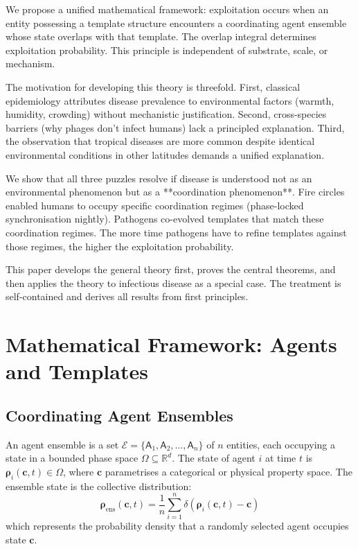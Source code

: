 \documentclass[11pt,twocolumn,a4paper]{article}
\newcommand{\R}{\mathbb{R}}
\newcommand{\Agent}{\mathsf{A}}
\newcommand{\State}{\boldsymbol{\rho}}
\begin{document}
We propose a unified mathematical framework: exploitation occurs when an entity possessing a template structure encounters a coordinating agent ensemble whose state overlaps with that template. The overlap integral determines exploitation probability. This principle is independent of substrate, scale, or mechanism.

The motivation for developing this theory is threefold. First, classical epidemiology attributes disease prevalence to environmental factors (warmth, humidity, crowding) without mechanistic justification. Second, cross-species barriers (why phages don't infect humans) lack a principled explanation. Third, the observation that tropical diseases are more common despite identical environmental conditions in other latitudes demands a unified explanation.

We show that all three puzzles resolve if disease is understood not as an environmental phenomenon but as a **coordination phenomenon**. Fire circles enabled humans to occupy specific coordination regimes (phase-locked synchronisation nightly). Pathogens co-evolved templates that match these coordination regimes. The more time pathogens have to refine templates against those regimes, the higher the exploitation probability.

This paper develops the general theory first, proves the central theorems, and then applies the theory to infectious disease as a special case. The treatment is self-contained and derives all results from first principles.

\section{Mathematical Framework: Agents and Templates}
\label{sec:framework}

\subsection{Coordinating Agent Ensembles}

\begin{definition}
An agent ensemble is a set $\mathcal{E} = \{\Agent_1, \Agent_2, \ldots, \Agent_n\}$ of $n$ entities, each occupying a state in a bounded phase space $\Omega \subseteq \R^d$. The state of agent $i$ at time $t$ is $\State_i(\mathbf{c}, t) \in \Omega$, where $\mathbf{c}$ parametrises a categorical or physical property space. The ensemble state is the collective distribution:
\begin{equation}
\State_{\mathrm{ens}}(\mathbf{c}, t) = \frac{1}{n}\sum_{i=1}^n \delta(\State_i(\mathbf{c}, t) - \mathbf{c})
\label{eq:ensemble_state}
\end{equation}
which represents the probability density that a randomly selected agent occupies state $\mathbf{c}$.
\end{definition}
\end{document}
